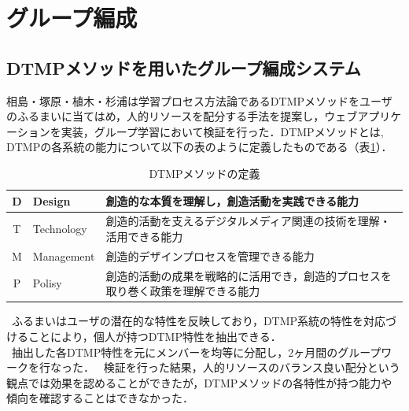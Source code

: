 \documentclass{funthesis}
\begin{document}
\section{グループ編成}

\subsection{DTMPメソッドを用いたグループ編成システム}

相島・塚原・植木・杉浦\cite{A5}は学習プロセス方法論であるDTMPメソッドをユーザのふるまいに当てはめ，人的リソースを配分する手法を提案し，ウェブアプリケーションを実装，グループ学習において検証を行った．DTMPメソッドとは,  DTMPの各系統の能力について以下の表のように定義したものである（表\ref{DTMP}）．

\begin{table}[h]
\begin{center}
  \begin{tabular}{|c|p{25mm}|p{105mm}|} \hline
    D & Design & 創造的な本質を理解し，創造活動を実践できる能力\tabularnewline \hline
    T & Technology & 
    創造的活動を支えるデジタルメディア関連の技術を理解・活用できる能力\tabularnewline \hline
    M &Management & 
    創造的デザインプロセスを管理できる能力\tabularnewline \hline
    P &Polisy &
    創造的活動の成果を戦略的に活用でき，創造的プロセスを取り巻く政策を理解できる能力\tabularnewline
    \hline
  \end{tabular}
  \caption{DTMPメソッドの定義}
  \label{DTMP}
  \end{center}
\end{table}


\ ふるまいはユーザの潜在的な特性を反映しており，DTMP系統の特性を対応づけることにより，個人が持つDTMP特性を抽出できる．\\
\ 抽出した各DTMP特性を元にメンバーを均等に分配し，2ヶ月間のグループワークを行なった．
\ 検証を行った結果，人的リソースのバランス良い配分という観点では効果を認めることができたが，DTMPメソッドの各特性が持つ能力や傾向を確認することはできなかった．
\end{document}
